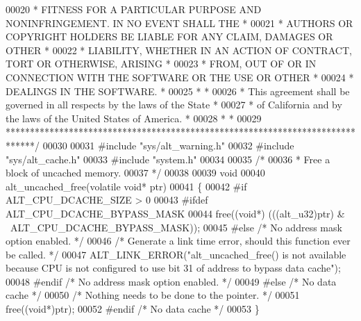 \begin{DoxyCode}
00020 \textcolor{comment}{* FITNESS FOR A PARTICULAR PURPOSE AND NONINFRINGEMENT. IN NO EVENT SHALL THE *}
00021 \textcolor{comment}{* AUTHORS OR COPYRIGHT HOLDERS BE LIABLE FOR ANY CLAIM, DAMAGES OR OTHER      *}
00022 \textcolor{comment}{* LIABILITY, WHETHER IN AN ACTION OF CONTRACT, TORT OR OTHERWISE, ARISING     *}
00023 \textcolor{comment}{* FROM, OUT OF OR IN CONNECTION WITH THE SOFTWARE OR THE USE OR OTHER         *}
00024 \textcolor{comment}{* DEALINGS IN THE SOFTWARE.                                                   *}
00025 \textcolor{comment}{*                                                                             *}
00026 \textcolor{comment}{* This agreement shall be governed in all respects by the laws of the State   *}
00027 \textcolor{comment}{* of California and by the laws of the United States of America.              *}
00028 \textcolor{comment}{*                                                                             *}
00029 \textcolor{comment}{******************************************************************************/}
00030 
00031 \textcolor{preprocessor}{#include "sys/alt_warning.h"}
00032 \textcolor{preprocessor}{#include "sys/alt_cache.h"}
00033 \textcolor{preprocessor}{#include "system.h"}
00034 
00035 \textcolor{comment}{/*}
00036 \textcolor{comment}{ * Free a block of uncached memory.}
00037 \textcolor{comment}{ */}
00038 
00039 \textcolor{keywordtype}{void} 
00040 alt_uncached_free(\textcolor{keyword}{volatile} \textcolor{keywordtype}{void}* ptr)
00041 \{
00042 \textcolor{preprocessor}{#if ALT\_CPU\_DCACHE\_SIZE > 0}
00043 \textcolor{preprocessor}{#ifdef ALT\_CPU\_DCACHE\_BYPASS\_MASK}
00044   free((\textcolor{keywordtype}{void}*) (((alt_u32)ptr) & ~ALT\_CPU\_DCACHE\_BYPASS\_MASK));
00045 \textcolor{preprocessor}{#else }\textcolor{comment}{/* No address mask option enabled. */}\textcolor{preprocessor}{}
00046   \textcolor{comment}{/* Generate a link time error, should this function ever be called. */}
00047   ALT_LINK_ERROR(\textcolor{stringliteral}{"alt\_uncached\_free() is not available because CPU is not configured to use bit 31 of
       address to bypass data cache"});
00048 \textcolor{preprocessor}{#endif }\textcolor{comment}{/* No address mask option enabled. */}\textcolor{preprocessor}{}
00049 \textcolor{preprocessor}{#else }\textcolor{comment}{/* No data cache */}\textcolor{preprocessor}{}
00050   \textcolor{comment}{/* Nothing needs to be done to the pointer. */}
00051   free((\textcolor{keywordtype}{void}*)ptr);
00052 \textcolor{preprocessor}{#endif }\textcolor{comment}{/* No data cache */}\textcolor{preprocessor}{}
00053 \}
\end{DoxyCode}
